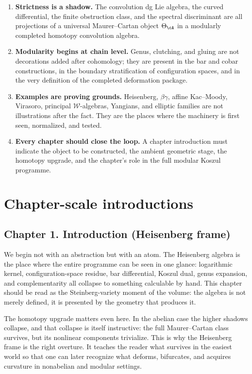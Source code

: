 \begin{enumerate}
\item \textbf{Strictness is a shadow.}  The convolution dg Lie algebra, the curved differential, the finite obstruction class, and the spectral discriminant are all projections of a universal Maurer--Cartan object $\Theta_{\cA}$ in a modularly completed homotopy convolution algebra.
\item \textbf{Modularity begins at chain level.}  Genus, clutching, and gluing are not decorations added after cohomology; they are present in the bar and cobar constructions, in the boundary stratification of configuration spaces, and in the very definition of the completed deformation package.
\item \textbf{Examples are proving grounds.}  Heisenberg, $\beta\gamma$, affine Kac--Moody, Virasoro, principal $\mathcal W$-algebras, Yangians, and elliptic families are not illustrations after the fact.  They are the places where the machinery is first seen, normalized, and tested.
\item \textbf{Every chapter should close the loop.}  A chapter introduction must indicate the object to be constructed, the ambient geometric stage, the homotopy upgrade, and the chapter's role in the full modular Koszul programme.
\end{enumerate}

\section*{Chapter-scale introductions}

\subsection*{Chapter 1. Introduction (Heisenberg frame)}
We begin not with an abstraction but with an atom.  The Heisenberg algebra is the place where the entire programme can be seen in one glance: logarithmic kernel, configuration-space residue, bar differential, Koszul dual, genus expansion, and complementarity all collapse to something calculable by hand.  This chapter should be read as the Steinberg-variety moment of the volume: the algebra is not merely defined, it is presented by the geometry that produces it.

The homotopy upgrade matters even here.  In the abelian case the higher shadows collapse, and that collapse is itself instructive: the full Maurer--Cartan class survives, but its nonlinear components trivialize.  This is why the Heisenberg frame is the right overture.  It teaches the reader what survives in the easiest world so that one can later recognize what deforms, bifurcates, and acquires curvature in nonabelian and modular settings.

